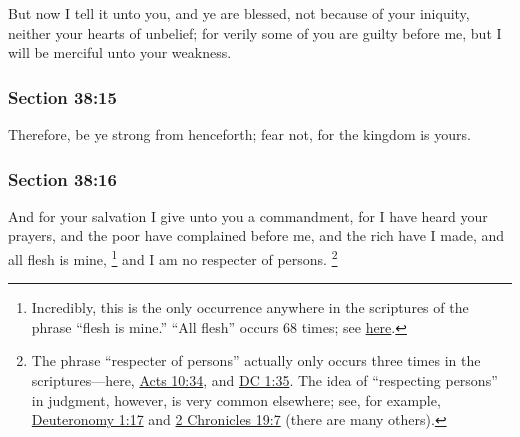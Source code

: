 		But now I tell it unto you, and ye are blessed, not because of your iniquity, neither your hearts of unbelief; for verily some of you are guilty before me, but I will be merciful unto your weakness.


	\subsubsection{Section 38:15} %
		\label{DC38-15}

		Therefore, be ye strong from henceforth; fear not, for the kingdom is yours.


	\subsubsection{Section 38:16} %
		\label{DC38-16}

		And for your salvation I give unto you a commandment, for I have heard your prayers, and the poor have complained before me, and the rich have I made, and all flesh is mine,%
			\footnote{%
				Incredibly, this is the only occurrence anywhere in the scriptures of the phrase ``flesh is mine.'' ``All flesh'' occurs 68 times; see \hyperref[FLESH-PHRASES]{here}.
				}
		and I am no respecter of persons.%
			\footnote{%
				The phrase ``respecter of persons'' actually only occurs three times in the scriptures---here, \hyperref[ACTS-10-34]{Acts 10:34}, and \hyperref[DC1-35]{DC 1:35}. The idea of ``respecting persons'' in judgment, however, is very common elsewhere; see, for example, \hyperref[DEUTERONOMY-1-17]{Deuteronomy 1:17} and \hyperref[2CHRONICLES-19-7]{2 Chronicles 19:7} (there are many others).
				}

